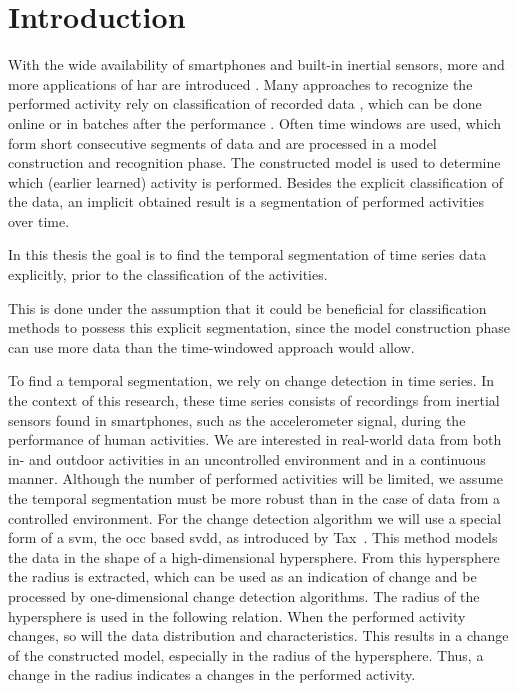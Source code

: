 \chapter{Introduction}

\label{Chapter1} %


With the wide availability of smartphones and built-in inertial sensors, more and more applications of \gls{har} are introduced \cite{avci2010activity,derawi2010accelerometer,guenterberg2009distributed}.
Many approaches to recognize the performed activity rely on classification of recorded data \cite{devaul2001real,ward2006activity,yang2008using,anguita2012human,bao2004activity,bernecker2012activity,he2008activity}, which can be done online or in batches after the performance \cite{duque2012offline}.
Often time windows are used, which form short consecutive segments of data and are processed in a model construction and recognition phase.
The constructed model is used to determine which (earlier learned) activity is performed.
Besides the explicit classification of the data, an implicit obtained result is a segmentation of performed activities over time.

In this thesis the goal is to find the temporal segmentation of time series data explicitly, prior to the classification of the activities.

This is done under the assumption that it could be beneficial for classification methods to possess this explicit segmentation, since the model construction phase can use more data than the time-windowed approach would allow.

To find a temporal segmentation, we rely on change detection in time series.
In the context of this research, these time series consists of recordings from inertial sensors found in smartphones, such as the accelerometer signal, during the performance of human activities.
We are interested in real-world data from both in- and outdoor activities in an uncontrolled environment and in a continuous manner.
Although the number of performed activities will be limited, we assume the temporal segmentation must be more robust than in the case of data from a controlled environment.
For the change detection algorithm we will use a special form of a \gls{svm}, the \gls{occ} based \gls{svdd}, as introduced by Tax~\cite{tax2001one}.
This method models the data in the shape of a high-dimensional hypersphere.
From this hypersphere the radius is extracted, which can be used as an indication of change and be processed by one-dimensional change detection algorithms.
The radius of the hypersphere is used in the following relation.
When the performed activity changes, so will the data distribution and characteristics.
This results in a change of the constructed model, especially in the radius of the hypersphere.
Thus, a change in the radius indicates a changes in the performed activity.

